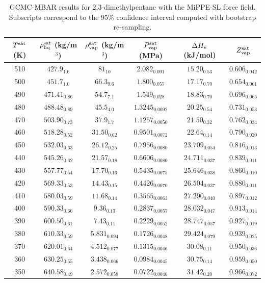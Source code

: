 \documentclass[journal=jctc,manuscript=article]{achemso}
\begin{document}
\begin{table}[htb!]
	\caption{GCMC-MBAR results for 2,3-dimethylpentane with the MiPPE-SL force field. Subscripts correspond to the 95\% confidence interval computed with bootstrap re-sampling.}
	\begin{center}
		\begin{tabular}{|c|c|c|c|c|c|}
			\hline
			$T^{\rm sat}$ (K) & $\rho_{\rm liq}^{\rm sat}$ (kg/m$^3$) & $\rho_{\rm vap}^{\rm sat}$ (kg/m$^3$) & $P_{\rm vap}^{\rm sat}$ (MPa) & $\Delta H_{\rm v}$ (kJ/mol) & $Z_{\rm vap}^{\rm sat}$ \\ \hline
			510 & $427.9_{1.6}$ & $81_{10}$ & $2.082_{0.091}$ & $15.20_{0.53}$ & $0.606_{0.042}$ \\
			500 & $451.7_{1.0}$ & $66.3_{9.6}$ & $1.800_{0.057}$ & $17.17_{0.70}$ & $0.654_{0.061}$ \\
			490 & $471.41_{0.86}$ & $54.7_{7.1}$ & $1.549_{0.028}$ & $18.83_{0.70}$ & $0.696_{0.065}$ \\
			480 & $488.48_{0.89}$ & $45.5_{4.0}$ & $1.3245_{0.0092}$ & $20.25_{0.54}$ & $0.731_{0.053}$ \\
			470 & $503.90_{0.73}$ & $37.9_{1.7}$ & $1.1257_{0.0050}$ & $21.50_{0.32}$ & $0.762_{0.034}$ \\
			460 & $518.28_{0.52}$ & $31.50_{0.62}$ & $0.9501_{0.0072}$ & $22.64_{0.14}$ & $0.790_{0.020}$ \\
			450 & $532.03_{0.63}$ & $26.12_{0.25}$ & $0.7956_{0.0080}$ & $23.709_{0.054}$ & $0.816_{0.013}$ \\
			440 & $545.26_{0.62}$ & $21.57_{0.18}$ & $0.6606_{0.0080}$ & $24.711_{0.037}$ & $0.839_{0.011}$ \\
			430 & $557.77_{0.54}$ & $17.70_{0.16}$ & $0.5435_{0.0075}$ & $25.646_{0.038}$ & $0.860_{0.010}$ \\
			420 & $569.33_{0.53}$ & $14.43_{0.15}$ & $0.4426_{0.0070}$ & $26.504_{0.037}$ & $0.880_{0.011}$ \\
			410 & $580.03_{0.59}$ & $11.68_{0.14}$ & $0.3565_{0.0063}$ & $27.290_{0.040}$ & $0.897_{0.012}$ \\
			400 & $590.33_{0.66}$ & $9.36_{0.13}$ & $0.2837_{0.0057}$ & $28.032_{0.047}$ & $0.913_{0.014}$ \\
			390 & $600.50_{0.61}$ & $7.43_{0.11}$ & $0.2229_{0.0052}$ & $28.747_{0.057}$ & $0.927_{0.019}$ \\
			380 & $610.33_{0.59}$ & $5.831_{0.094}$ & $0.1726_{0.0048}$ & $29.424_{0.079}$ & $0.939_{0.025}$ \\
			370 & $620.01_{0.64}$ & $4.512_{0.077}$ & $0.1315_{0.0046}$ & $30.08_{0.11}$ & $0.950_{0.036}$ \\
			360 & $630.25_{0.55}$ & $3.438_{0.066}$ & $0.0984_{0.0045}$ & $30.75_{0.14}$ & $0.959_{0.050}$ \\
			350 & $640.58_{0.49}$ & $2.572_{0.058}$ & $0.0722_{0.0046}$ & $31.42_{0.20}$ & $0.966_{0.072}$ \\
			\hline
		\end{tabular}
	\end{center}
\end{table}
\end{document}
